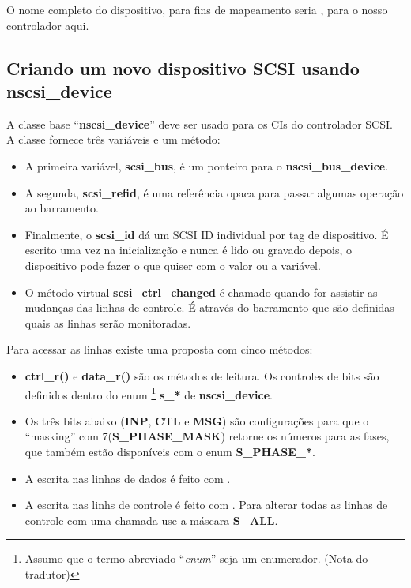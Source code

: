 \documentclass[letterpaper,10pt,brazil]{sphinxmanual}
\begin{document}
O nome completo do dispositivo, para fins de mapeamento seria
,  para o nosso
controlador aqui.


\subsection{Criando um novo dispositivo SCSI usando nscsi\_device}
\label{techspecs/nscsi:criando-um-novo-dispositivo-scsi-usando-nscsi-device}
A classe base ``\textbf{nscsi\_device}'' deve ser usado para os CIs do
controlador SCSI. A classe fornece três variáveis e um método:
\begin{itemize}
\item {} 
A primeira variável, \textbf{scsi\_bus}, é um ponteiro para o
\textbf{nscsi\_bus\_device}.

\item {} 
A segunda, \textbf{scsi\_refid}, é uma referência opaca para passar algumas
operação ao barramento.

\item {} 
Finalmente, o \textbf{scsi\_id} dá um SCSI ID individual por tag de
dispositivo. É escrito uma vez na inicialização e nunca é lido ou
gravado depois, o dispositivo pode fazer o que quiser com o valor ou a
variável.

\item {} 
O método virtual \textbf{scsi\_ctrl\_changed} é chamado quando for assistir
as mudanças das linhas de controle. É através do barramento que são
definidas quais as linhas serão monitoradas.

\end{itemize}

Para acessar as linhas existe uma proposta com cinco métodos:
\begin{itemize}
\item {} 
\textbf{ctrl\_r()} e \textbf{data\_r()} são os métodos de leitura.
Os controles de bits são definidos dentro do enum \footnote[1]{\sphinxAtStartFootnote%
Assumo que o termo abreviado ``\emph{enum}'' seja um enumerador.
(Nota do tradutor)
} \textbf{s\_*} de
\textbf{nscsi\_device}.

\item {} 
Os três bits abaixo (\textbf{INP}, \textbf{CTL} e \textbf{MSG}) são configurações
para que o ``masking'' com 7(\textbf{S\_PHASE\_MASK}) retorne os números para
as fases, que também estão disponíveis com o enum \textbf{S\_PHASE\_*}.

\item {} 
A escrita nas linhas de dados é feito com .

\item {} 
A escrita nas linhs de controle é feito com
.
Para alterar todas as linhas de controle com uma chamada use a máscara
\textbf{S\_ALL}.

\end{itemize}
\end{document}
